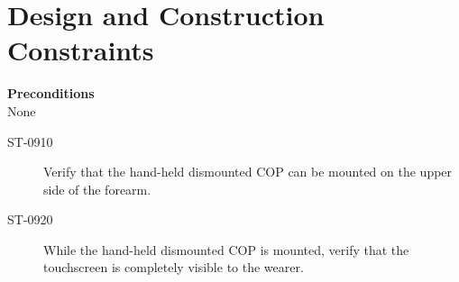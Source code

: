 \section{Design and Construction Constraints}

\textbf{Preconditions} \\	
None
~\

\begin{description}
\item[ST-0910]Verify that the hand-held dismounted COP can be mounted on the upper side of the forearm. 
\item[ST-0920]While the hand-held dismounted COP is mounted, verify that the touchscreen is completely visible to the wearer.  
\end{description}
